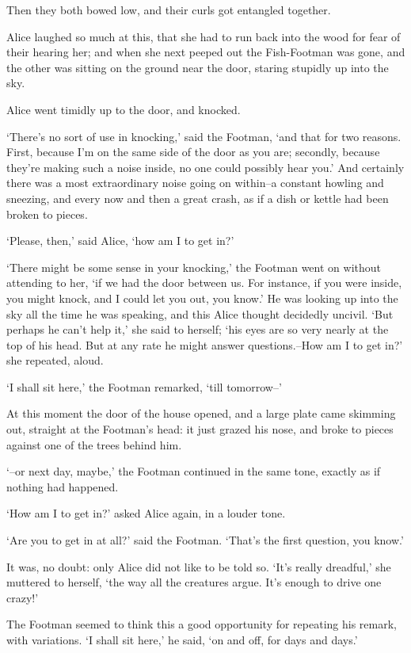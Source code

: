 \documentclass[statementpaper,twoside,openany]{memoir}
\begin{document}
Then they both bowed low, and their curls got entangled together.

Alice laughed so much at this, that she had to run back into the wood for fear of their hearing her; and when she next peeped out the Fish-Footman was gone, and the other was sitting on the ground near the door, staring stupidly up into the sky.

Alice went timidly up to the door, and knocked.

`There's no sort of use in knocking,' said the Footman, `and that for two reasons. First, because I'm on the same side of the door as you are; secondly, because they're making such a noise inside, no one could possibly hear you.' And certainly there was a most extraordinary noise going on within--a constant howling and sneezing, and every now and then a great crash, as if a dish or kettle had been broken to pieces.

`Please, then,' said Alice, `how am I to get in?'

`There might be some sense in your knocking,' the Footman went on without attending to her, `if we had the door between us. For instance, if you were inside, you might knock, and I could let you out, you know.' He was looking up into the sky all the time he was speaking, and this Alice thought decidedly uncivil. `But perhaps he can't help it,' she said to herself; `his eyes are so very nearly at the top of his head. But at any rate he might answer questions.--How am I to get in?' she repeated, aloud.

`I shall sit here,' the Footman remarked, `till tomorrow--'

At this moment the door of the house opened, and a large plate came skimming out, straight at the Footman's head: it just grazed his nose, and broke to pieces against one of the trees behind him.

`--or next day, maybe,' the Footman continued in the same tone, exactly as if nothing had happened.

`How am I to get in?' asked Alice again, in a louder tone.

`Are you to get in at all?' said the Footman. `That's the first question, you know.'

It was, no doubt: only Alice did not like to be told so. `It's really dreadful,' she muttered to herself, `the way all the creatures argue. It's enough to drive one crazy!'

The Footman seemed to think this a good opportunity for repeating his remark, with variations. `I shall sit here,' he said, `on and off, for days and days.'
\end{document}
